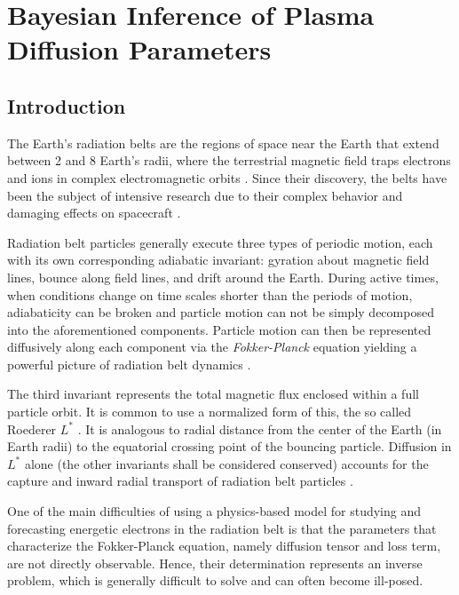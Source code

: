 \chapter{Bayesian Inference of Plasma Diffusion Parameters}\label{chapter:bayes_diff_chapter}

\section{Introduction}

The Earth's radiation belts are the regions of space near 
the Earth that extend between 2 and 8 Earth's radii, where the terrestrial magnetic field traps 
electrons and ions in complex electromagnetic orbits  \citep{vanAllen}. Since their discovery,
the belts have been the subject of intensive research due to their complex behavior
and damaging effects on spacecraft \citep{GUBBY20021723, WellingSatellite, baker2002}.

Radiation belt particles generally execute three types of periodic motion, 
each with its own corresponding adiabatic invariant: 
gyration about magnetic field lines, bounce along field lines, 
and drift around the Earth. During active times, when conditions 
change on time scales shorter than the periods of motion, 
adiabaticity can be broken and particle motion can not be
simply decomposed into the aforementioned components. Particle motion 
can then be represented diffusively along each component via the 
\emph{Fokker-Planck} equation yielding a powerful picture of 
radiation belt dynamics \citep{schulz2012particle}.

The third invariant represents the total magnetic flux enclosed within 
a full particle orbit. It is common to use a normalized form of this, the 
so called Roederer $L^{*}$ \citep{Roederer1970}. It is analogous to radial 
distance from the center of the Earth (in Earth radii) to the equatorial 
crossing point of the bouncing particle. Diffusion in $L^{*}$ alone 
(the other invariants shall be considered conserved) accounts for the
capture and inward radial transport of radiation belt particles 
\citep{Roederer1970,JGR:JGR4463}.

One of the main difficulties of using a physics-based model for studying and 
forecasting energetic electrons in the radiation belt is that the parameters 
that characterize the Fokker-Planck equation, namely diffusion tensor and loss term,
are not directly observable. Hence, their determination represents an inverse problem,
which is generally difficult to solve and can often become ill-posed.

